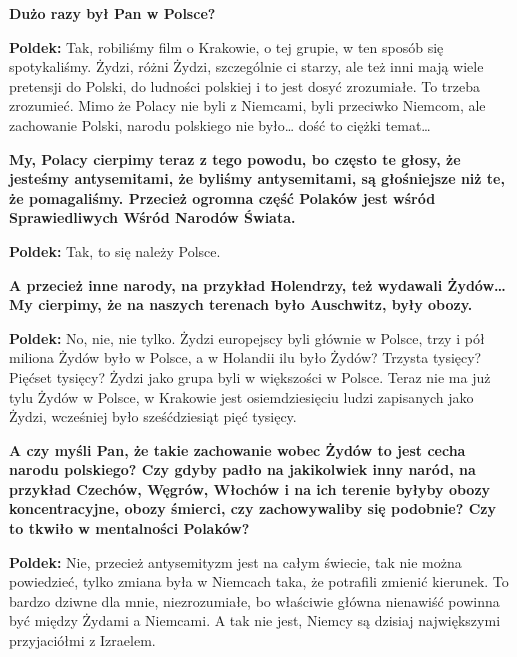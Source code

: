 \begin{otherlanguage}{polish}
\textbf{Dużo razy był Pan w Polsce?}

\textbf{Poldek:} Tak, robiliśmy film o Krakowie, o tej grupie, w ten sposób się spotykaliśmy. Żydzi, różni Żydzi, szczególnie ci starzy, ale też inni mają wiele pretensji do Polski, do ludności polskiej i to jest dosyć zrozumiałe. To trzeba zrozumieć. Mimo że Polacy nie byli z Niemcami, byli przeciwko Niemcom, ale zachowanie Polski, narodu polskiego nie było… dość to ciężki temat…
 
\textbf{My, Polacy cierpimy teraz z tego powodu, bo często te głosy, że jesteśmy antysemitami, że byliśmy antysemitami, są głośniejsze niż te, że pomagaliśmy. Przecież ogromna część Polaków jest wśród Sprawiedliwych Wśród Narodów Świata.}

\textbf{Poldek:} Tak, to się należy Polsce.

\textbf{A przecież inne narody, na przykład Holendrzy, też wydawali Żydów… My cierpimy, że na naszych terenach było Auschwitz, były obozy.}

\textbf{Poldek:} No, nie, nie tylko. Żydzi europejscy byli głównie w Polsce, trzy i pół miliona Żydów było w Polsce, a w Holandii ilu było Żydów? Trzysta tysięcy? Pięćset tysięcy? Żydzi jako grupa byli w większości w Polsce. Teraz nie ma już tylu Żydów w Polsce, w Krakowie jest osiemdziesięciu ludzi zapisanych jako Żydzi, wcześniej było sześćdziesiąt pięć tysięcy.

\textbf{A czy myśli Pan, że takie zachowanie wobec Żydów to jest cecha narodu polskiego? Czy gdyby padło na jakikolwiek inny naród, na przykład Czechów, Węgrów, Włochów i na ich terenie byłyby obozy koncentracyjne, obozy śmierci, czy zachowywaliby się podobnie? Czy to tkwiło w mentalności Polaków?}

\textbf{Poldek:} Nie, przecież antysemityzm jest na całym świecie, tak nie można powiedzieć, tylko zmiana była w Niemcach taka, że potrafili zmienić kierunek. To bardzo dziwne dla mnie, niezrozumiałe, bo właściwie główna nienawiść powinna być między Żydami a Niemcami. A tak nie jest, Niemcy są dzisiaj największymi przyjaciółmi z Izraelem.
\end{otherlanguage}